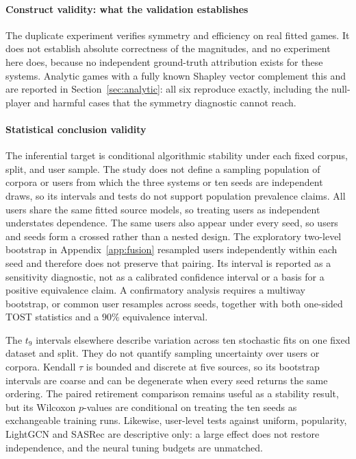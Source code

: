 \documentclass[pdflatex,sn-basic,Numbered]{sn-jnl}
\theoremstyle{plain}
\theoremstyle{definition}
\begin{document}
\paragraph{Construct validity: what the validation establishes}
The duplicate experiment verifies symmetry and efficiency on real fitted games.
It does not establish absolute correctness of the magnitudes, and no experiment
here does, because no independent ground-truth attribution exists for these
systems. Analytic games with a fully known Shapley vector complement this and
are reported in Section~\ref{sec:analytic}: all six reproduce exactly,
including the null-player and harmful cases that the symmetry diagnostic cannot
reach.

\paragraph{Statistical conclusion validity}
The inferential target is conditional algorithmic stability under each fixed
corpus, split, and user sample. The study does not define a sampling population
of corpora or users from which the three systems or ten seeds are independent
draws, so its intervals and tests do not support population prevalence claims.
All users share the same fitted source models, so treating users as independent
understates dependence. The same users also appear under every seed, so users
and seeds form a crossed rather than a nested design. The exploratory
two-level bootstrap in Appendix~\ref{app:fusion} resampled users independently
within each seed and therefore does not preserve that pairing. Its interval is
reported as a sensitivity diagnostic, not as a calibrated confidence interval
or a basis for a positive equivalence claim. A confirmatory analysis requires a
multiway bootstrap, or common user resamples across seeds, together with both
one-sided TOST statistics and a $90\%$ equivalence interval.

The $t_9$ intervals elsewhere describe variation across ten stochastic fits on
one fixed dataset and split. They do not quantify sampling uncertainty over
users or corpora. Kendall $\tau$ is bounded and discrete at five sources, so
its bootstrap intervals are coarse and can be degenerate when every seed
returns the same ordering. The paired retirement comparison remains useful as
a stability result, but its Wilcoxon $p$-values are conditional on treating the
ten seeds as exchangeable training runs. Likewise, user-level tests against
uniform, popularity, LightGCN and SASRec are descriptive only: a large effect
does not restore independence, and the neural tuning budgets are unmatched.
\end{document}

